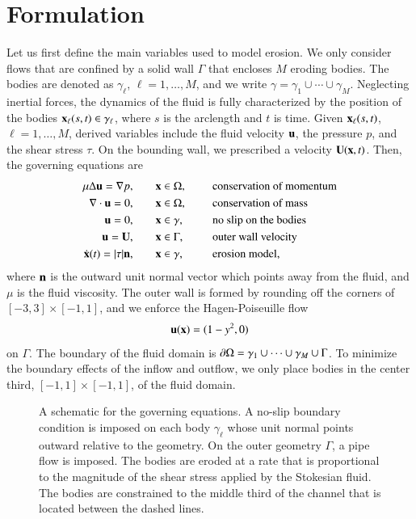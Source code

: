 \documentclass[preprint, 10pt]{elsarticle}
\begin{document}
\section{Formulation\label{s:formulation}} 
Let us first define the main variables used to model erosion.  We only
consider flows that are confined by a solid wall $\Gamma$ that encloses
$M$ eroding bodies.  The bodies are denoted as $\gamma_\ell$,
$\ell=1,\ldots,M$, and we write $\gamma = \gamma_1 \cup \cdots \cup
\gamma_M$.  Neglecting inertial forces, the dynamics of the fluid is
fully characterized by the position of the bodies ${\mathbf{x}}_\ell(s,t) \in
\gamma_\ell$, where $s$ is the arclength and $t$ is time.  Given
${\mathbf{x}}_\ell(s,t)$, $\ell=1,\ldots,M$, derived variables include the fluid
velocity ${\mathbf{u}}$, the pressure $p$, and the shear stress $\tau$.   On the
bounding wall, we prescribed a velocity ${\mathbf{U}}({\mathbf{x}},t)$.  Then, the
governing equations are
\begin{equation}
\label{eqn:erosionModel}
\begin{split}
  \mu \Delta {\mathbf{u}} = {\nabla} p, &\hspace{20pt} {\mathbf{x}} \in \Omega, \hspace*{.2in} &&\mbox{conservation
of momentum}\\
{\nabla} \cdot {\mathbf{u}} = 0, &\hspace{20pt} {\mathbf{x}} \in \Omega, \hspace*{.2in}
&&\mbox{conservation of mass} \\
{\mathbf{u}} = 0, &\hspace{20pt} {\mathbf{x}} \in \gamma, \hspace*{.2in} &&\mbox{no slip on the
bodies} \\
{\mathbf{u}} = {\mathbf{U}}, &\hspace{20pt} {\mathbf{x}} \in \Gamma, \hspace*{.2in} &&\mbox{outer wall
velocity} \\
\dot{{\mathbf{x}}}(t) = \lvert \tau \rvert {\mathbf{n}}, &\hspace{20pt} {\mathbf{x}} \in \gamma,
&&\mbox{erosion model},
\end{split}
\end{equation}
where ${\mathbf{n}}$ is the outward unit normal vector which points away from the
fluid, and $\mu$ is the fluid viscosity.  The outer wall is formed by
rounding off the corners of $[-3,3] \times [-1,1]$, and we enforce the
Hagen-Poiseuille flow
\begin{align*}
  {\mathbf{u}}({\mathbf{x}}) = (1-y^2,0)
\end{align*}
on $\Gamma$.  The boundary of the fluid domain is ${\partial}\Omega = \gamma_1
\cup \cdots \cup \gamma_M \cup \Gamma$.  To minimize the boundary
effects of the inflow and outflow, we only place bodies in the center
third, $[-1,1] \times [-1,1]$, of the fluid domain.
\begin{figure}[htpb]
  \centering
  
  \caption{\label{fig:schematic} A schematic for the governing
    equations.  A no-slip boundary condition is imposed on each body
    $\gamma_\ell$ whose unit normal points outward relative to the
    geometry.  On the outer geometry $\Gamma$, a pipe flow is imposed.
    The bodies are eroded at a rate that is proportional to the
    magnitude of the shear stress applied by the Stokesian fluid.  The
    bodies are constrained to the middle third of the channel that is
    located between the dashed lines.}
\end{figure}
\end{document}
